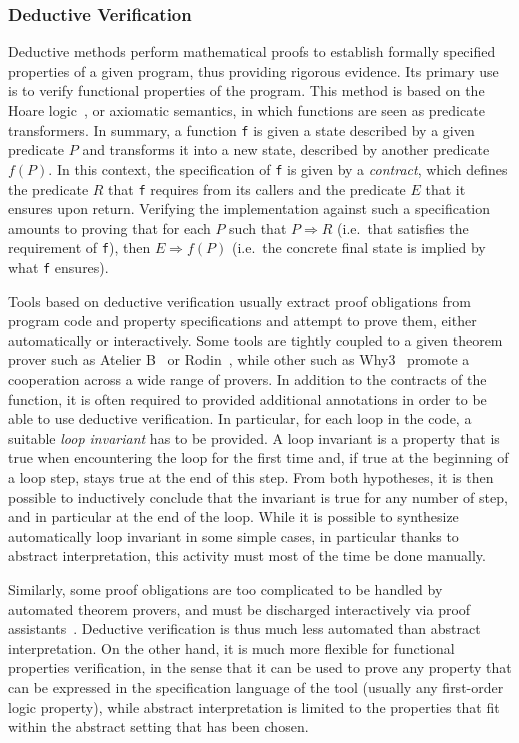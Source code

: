 \documentclass{template/openetcs_report}
\begin{document}
\subsubsection{Deductive Verification}
\label{sec:deduct-verif}
Deductive methods
\cite{Beckert.Marche.2010}
\cite{Ledinot.Pariente.2010}\nocite{Beckert.Marche.2010}\cite{Abrial1996}
\cite{Abrial2005}
perform mathematical proofs to establish formally specified properties
of a given program, thus providing rigorous evidence. Its primary use is to
verify functional properties of the program.
This method is based on the Hoare logic~\cite{Hoare.1969,Hoare.Wirth.1973},
or axiomatic semantics, in
which functions are seen as predicate transformers. In summary, a function
\texttt{f}
is given a state described by a given predicate $P$ and transforms 
it into a new state, described by another predicate $f(P)$.
In this context, the specification of \texttt{f} is given by a \emph{contract}, 
which defines the predicate $R$ that \texttt{f} requires from its callers and
the predicate $E$ that it ensures upon return. Verifying the implementation
against such a specification amounts to proving that for each $P$ such that
$P\Rightarrow R$ (i.e.\ that satisfies the requirement of \texttt{f}), then
$E\Rightarrow f(P)$ 
(i.e.\ the concrete final state is implied by what \texttt{f} ensures).

%
Tools based on deductive verification usually extract proof obligations 
from program code and property specifications and attempt to 
prove them, either automatically or interactively. Some tools are tightly
coupled to a given theorem prover such as Atelier B~\cite{atelierb} or Rodin~\cite{rodin}, while other such as Why3~\cite{why3} 
promote a cooperation across a wide range of provers.
%
In addition to the contracts of the function, it is often required to provided
additional annotations in order to be able to use deductive verification. In
particular, for each loop in the code, a suitable \emph{loop invariant} has
to be provided. A loop invariant is a property that is true when encountering
the loop for the first time and, if true at the beginning of a loop step, stays
true at the end of this step. From both hypotheses, it is then possible to
inductively conclude that the invariant is true for any number of step, and in
particular at the end of the loop. While it is possible to synthesize
automatically loop invariant in some simple cases, in particular thanks to
abstract interpretation, this activity must most of the time be done manually.

Similarly, some proof obligations are too complicated to be handled by automated
theorem provers, and must be discharged interactively via proof
assistants~\cite{coq,isabelle}. Deductive verification is thus much less
automated than abstract interpretation. On the other hand, it is much more
flexible for functional properties verification, in the sense that it can be
used to prove any property that can be expressed in the specification language
of the tool (usually any first-order logic property), while abstract
interpretation is limited to the properties that fit within the abstract setting
that has been chosen.
\end{document}
